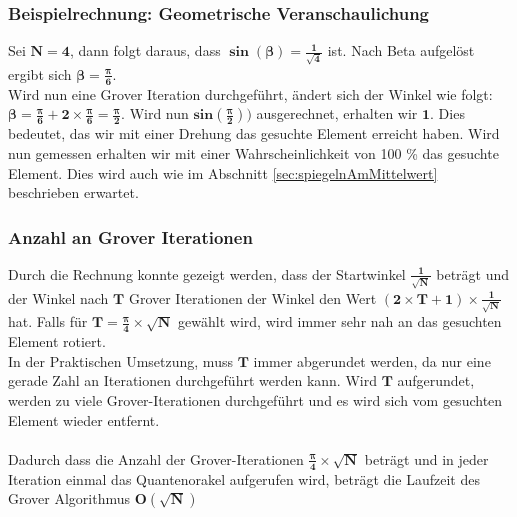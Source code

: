 \subsubsection{Beispielrechnung: Geometrische Veranschaulichung}
Sei $\mathbf{N=4}$, dann folgt daraus, dass $\mathbf{\sin(\beta) = \frac{1}{\sqrt{4}}}$ ist. Nach Beta aufgelöst ergibt sich $\mathbf{\beta = \frac{\pi}{6}}$.
\\
Wird nun eine Grover Iteration durchgeführt, ändert sich der Winkel wie folgt: $\mathbf{\beta = \frac{\pi}{6} + 2 \times \frac{\pi}{6}  = \frac{\pi}{2}}$. Wird nun $\mathbf{sin(\frac{\pi}{2}))}$ ausgerechnet, erhalten wir $\mathbf{1}$. Dies bedeutet, das wir mit einer Drehung das gesuchte Element erreicht haben. Wird nun gemessen erhalten wir mit einer Wahrscheinlichkeit von 100 \% das gesuchte Element. Dies wird auch wie im Abschnitt  \ref{sec:spiegelnAmMittelwert}  beschrieben erwartet.

\subsubsection{Anzahl an Grover Iterationen}
Durch die Rechnung konnte gezeigt werden, dass der Startwinkel $\mathbf{\frac{1}{\sqrt{N}}}$ beträgt und der Winkel nach $\mathbf{T}$ Grover Iterationen der Winkel den Wert $\mathbf{(2 \times T + 1)\times \frac{1}{\sqrt{N}}}$ hat. 
Falls für $\mathbf{T = \frac{\pi}{4}\times \sqrt{N}}$ gewählt wird, wird immer sehr nah an das gesuchten Element rotiert. 
\\
In der Praktischen Umsetzung, muss $\mathbf{T}$ immer abgerundet werden, da nur eine gerade Zahl an Iterationen durchgeführt werden kann. Wird $\mathbf{T}$ aufgerundet, werden zu viele Grover-Iterationen durchgeführt und es wird sich vom gesuchten Element wieder entfernt.
\\
\\
Dadurch dass die Anzahl der Grover-Iterationen $\mathbf{ \frac{\pi}{4}\times \sqrt{N}}$ beträgt und in jeder Iteration einmal das Quantenorakel aufgerufen wird, beträgt die Laufzeit des Grover Algorithmus $\mathbf{O(\sqrt N)}$
